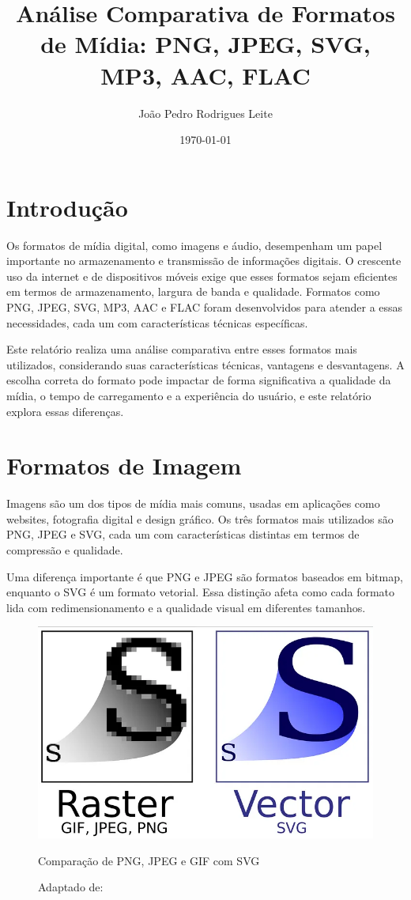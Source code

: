 \documentclass[12pt]{report}
\title{Análise Comparativa de Formatos de Mídia: PNG, JPEG, SVG, MP3, AAC, FLAC}
\author{João Pedro Rodrigues Leite}
\date{\today}
\begin{document}
	
	\maketitle
	
	\section{Introdução}
	Os formatos de mídia digital, como imagens e áudio, desempenham um papel importante no armazenamento e transmissão de informações digitais. O crescente uso da internet e de dispositivos móveis exige que esses formatos sejam eficientes em termos de armazenamento, largura de banda e qualidade. Formatos como PNG, JPEG, SVG, MP3, AAC e FLAC foram desenvolvidos para atender a essas necessidades, cada um com características técnicas específicas.
	
	Este relatório realiza uma análise comparativa entre esses formatos mais utilizados, considerando suas características técnicas, vantagens e desvantagens. A escolha correta do formato pode impactar de forma significativa a qualidade da mídia, o tempo de carregamento e a experiência do usuário, e este relatório explora essas diferenças.

	
	\section{Formatos de Imagem} Imagens são um dos tipos de mídia mais comuns, usadas em aplicações como websites, fotografia digital e design gráfico. Os três formatos mais utilizados são PNG, JPEG e SVG, cada um com características distintas em termos de compressão e qualidade.
	
	Uma diferença importante é que PNG e JPEG são formatos baseados em bitmap, enquanto o SVG é um formato vetorial. Essa distinção afeta como cada formato lida com redimensionamento e a qualidade visual em diferentes tamanhos.

	\begin{figure}[H]
		\centering
		\includegraphics[width=0.5\linewidth]{figs/svgpng}
		\caption{Comparação de PNG, JPEG e GIF com SVG}
		\label{fig:svgpng}
		\caption*{Adaptado de: \cite{glasgow2024}}
	\end{figure}
	
\end{document}
